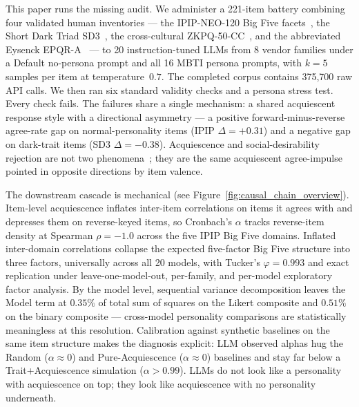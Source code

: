 \documentclass[11pt]{article}
\begin{document}
This paper runs the missing audit. We administer a 221-item battery combining four validated human inventories --- the IPIP-NEO-120 Big Five facets~\citep{johnson2014measuring}, the Short Dark Triad SD3~\citep{jones2014introducing}, the cross-cultural ZKPQ-50-CC~\citep{aluja2006cross}, and the abbreviated Eysenck EPQR-A~\citep{francis1992development} --- to 20 instruction-tuned LLMs from 8 vendor families under a Default no-persona prompt and all 16 MBTI persona prompts, with $k=5$ samples per item at temperature~$0.7$. The completed corpus contains 375{,}700 raw API calls. We then ran six standard validity checks and a persona stress test. Every check fails. The failures share a single mechanism: a shared acquiescent response style with a directional asymmetry --- a positive forward-minus-reverse agree-rate gap on normal-personality items (IPIP $\Delta=+0.31$) and a negative gap on dark-trait items (SD3 $\Delta=-0.38$). Acquiescence and social-desirability rejection are not two phenomena~\citep{couch1960yeasayers,crowne1960social,paulhus1991response,billiet2000modeling}; they are the same acquiescent agree-impulse pointed in opposite directions by item valence.

The downstream cascade is mechanical (see Figure~\ref{fig:causal_chain_overview}). Item-level acquiescence inflates inter-item correlations on items it agrees with and depresses them on reverse-keyed items, so Cronbach's $\alpha$ tracks reverse-item density at Spearman $\rho=-1.0$ across the five IPIP Big Five domains. Inflated inter-domain correlations collapse the expected five-factor Big Five structure into three factors, universally across all 20 models, with Tucker's $\varphi=0.993$ and exact replication under leave-one-model-out, per-family, and per-model exploratory factor analysis. By the model level, sequential variance decomposition leaves the Model term at $0.35\%$ of total sum of squares on the Likert composite and $0.51\%$ on the binary composite --- cross-model personality comparisons are statistically meaningless at this resolution. Calibration against synthetic baselines on the same item structure makes the diagnosis explicit: LLM observed alphas hug the Random ($\alpha\!\approx\!0$) and Pure-Acquiescence ($\alpha\!\approx\!0$) baselines and stay far below a Trait+Acquiescence simulation ($\alpha>0.99$). LLMs do not look like a personality with acquiescence on top; they look like acquiescence with no personality underneath.
\end{document}
